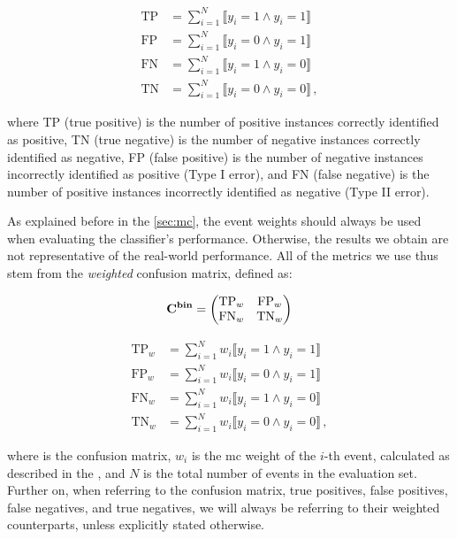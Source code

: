 \begin{align}
    \text{TP} & = \sum_{i=1}^{N} \llbracket y_i = 1 \land \hat{y}_i = 1 \rrbracket    \\
    \text{FP} & = \sum_{i=1}^{N} \llbracket y_i = 0 \land \hat{y}_i = 1 \rrbracket    \\
    \text{FN} & = \sum_{i=1}^{N} \llbracket y_i = 1 \land \hat{y}_i = 0 \rrbracket    \\
    \text{TN} & = \sum_{i=1}^{N} \llbracket y_i = 0 \land \hat{y}_i = 0 \rrbracket\,,
\end{align}

where TP (true positive) is the number of positive instances correctly identified as positive, TN (true negative) is the
number of negative instances correctly identified as negative, FP (false positive) is the number of negative instances
incorrectly identified as positive (Type I error), and FN (false negative) is the number of positive instances
incorrectly identified as negative (Type II error).

As explained before in the \autoref{sec:mc}, the event weights should always be used when evaluating the classifier's
performance. Otherwise, the results we obtain are not representative of the real-world performance. All of the metrics
we use thus stem from the \emph{weighted} confusion matrix, defined as:

\begin{equation}
    \mathbf{C}^{\textbf{bin}} = \begin{pmatrix}
        \text{TP}_{w} & \text{FP}_{w} \\
        \text{FN}_{w} & \text{TN}_{w} \\
    \end{pmatrix}
\end{equation}

\begin{align}
    \text{TP}_{w} & = \sum_{i=1}^{N} w_i \llbracket y_i = 1 \land \hat{y}_i = 1 \rrbracket    \\
    \text{FP}_{w} & = \sum_{i=1}^{N} w_i \llbracket y_i = 0 \land \hat{y}_i = 1 \rrbracket    \\
    \text{FN}_{w} & = \sum_{i=1}^{N} w_i \llbracket y_i = 1 \land \hat{y}_i = 0 \rrbracket    \\
    \text{TN}_{w} & = \sum_{i=1}^{N} w_i \llbracket y_i = 0 \land \hat{y}_i = 0 \rrbracket\,,
\end{align}

where \Cbin is the confusion matrix, $w_i$ is the \gls{mc} weight of the $i$-th event, calculated as described in the
, and $N$ is the total number of events in the evaluation set. Further on, when referring to
the confusion matrix, true positives, false positives, false negatives, and true negatives, we will always be referring
to their weighted counterparts, unless explicitly stated otherwise.


